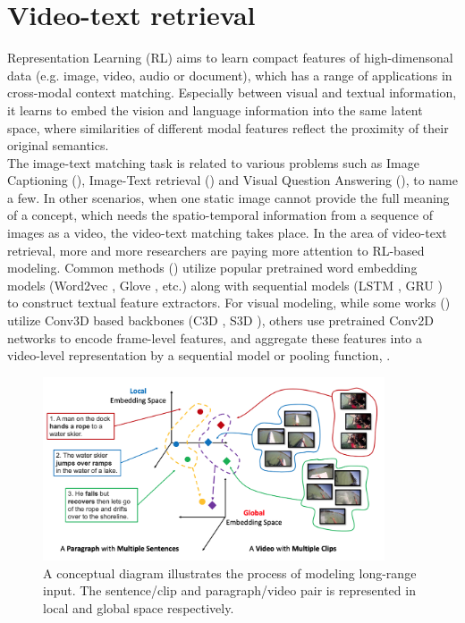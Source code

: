 \section{Video-text retrieval}
\label{sec:video-text_ret}
Representation Learning (RL) aims to learn compact features of high-dimensonal data (e.g. image, video, audio or document), which has a range of applications in cross-modal context matching. Especially between visual and textual information, it learns to embed the vision and language information into the same latent space, where similarities of different modal features reflect the proximity of their original semantics. \\
The image-text matching task is related to various problems such as Image Captioning (\cite{vinyals2015show, xu2015show, anderson2018bottom}), Image-Text retrieval (\cite{radenovic2018fine, vo2019composing, revaud2019learning}) and Visual Question Answering (\cite{xu2016ask, goyal2017making, anderson2018bottom}), to name a few.
In other scenarios, when one static image cannot provide the full meaning of a concept, which needs the spatio-temporal information from a sequence of images as a video, the video-text matching takes place. 
In the area of video-text retrieval, more and more researchers are paying more attention to RL-based modeling.
Common methods (\cite{lin2014visual, yu2017end, mithun2018learning, miech2018learning, dong2019dual}) utilize popular pretrained word embedding models (Word2vec \cite{mikolov2013efficient}, Glove \cite{pennington2014glove}, etc.) along with sequential models (LSTM \cite{hochreiter1997long}, GRU \cite{cho2014learning}) to construct textual feature extractors. For visual modeling, while some works (\cite{zhang2018cross, miech2020end}) utilize Conv3D based backbones (C3D \cite{carreira2017quo}, S3D \cite{xie2018rethinking}), others use pretrained Conv2D networks to encode frame-level features, and aggregate these features into a video-level representation by a sequential model or pooling function, \cite{li2019w2vv++,ging2020coot}. 
\begin{figure}[t!]
    \centering
    \includegraphics[width=0.9\textwidth]{resources/images/long_vid-text.png}
    \caption{A conceptual diagram illustrates the process of modeling long-range input. The sentence/clip and paragraph/video pair is represented in local and global space respectively. \cite{zhang2018cross}}
    \label{fig:long_vidtext}
\end{figure}
